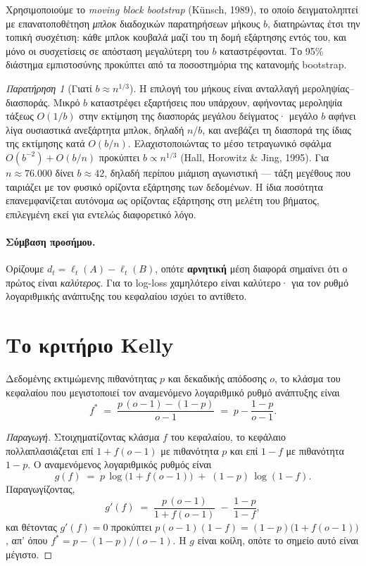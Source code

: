 \documentclass[12pt,a4paper,oneside]{report}
\renewcommand{\_}{\oldunderscore\allowbreak}
\theoremstyle{definition}
\theoremstyle{plain}
\theoremstyle{remark}
\newtheorem{remark}[theorem]{Παρατήρηση}
\begin{document}
Χρησιμοποιούμε το \emph{moving block bootstrap} (Künsch, 1989), το οποίο δειγματοληπτεί με
επανατοποθέτηση \emph{μπλοκ} διαδοχικών παρατηρήσεων μήκους $b$, διατηρώντας έτσι την τοπική
συσχέτιση: κάθε μπλοκ κουβαλά μαζί του τη δομή εξάρτησης εντός του, και μόνο οι συσχετίσεις
σε απόσταση μεγαλύτερη του $b$ καταστρέφονται. Το 95\% διάστημα εμπιστοσύνης προκύπτει από
τα ποσοστημόρια της κατανομής bootstrap.

\begin{remark}[Γιατί $b \approx n^{1/3}$]
Η επιλογή του μήκους είναι ανταλλαγή μεροληψίας--διασποράς. Μικρό $b$ καταστρέφει εξαρτήσεις
που υπάρχουν, αφήνοντας μεροληψία τάξεως $O(1/b)$ στην εκτίμηση της διασποράς μεγάλου
δείγματος· μεγάλο $b$ αφήνει λίγα ουσιαστικά ανεξάρτητα μπλοκ, δηλαδή $n/b$, και ανεβάζει τη
διασπορά της ίδιας της εκτίμησης κατά $O(b/n)$. Ελαχιστοποιώντας το μέσο τετραγωνικό σφάλμα
$O(b^{-2}) + O(b/n)$ προκύπτει $b \propto n^{1/3}$ (Hall, Horowitz \& Jing, 1995). Για
$n \approx 76.000$ δίνει $b \approx 42$, δηλαδή περίπου μιάμιση αγωνιστική --- τάξη μεγέθους
που ταιριάζει με τον φυσικό ορίζοντα εξάρτησης των δεδομένων. Η ίδια ποσότητα επανεμφανίζεται
αυτόνομα ως ορίζοντας εξάρτησης στη μελέτη του βήματος, επιλεγμένη εκεί για εντελώς
διαφορετικό λόγο.
\end{remark}

\paragraph{Σύμβαση προσήμου.} Ορίζουμε $d_t = \ell_t(A) - \ell_t(B)$, οπότε \textbf{αρνητική}
μέση διαφορά σημαίνει ότι ο πρώτος είναι \emph{καλύτερος}. Για το log-loss χαμηλότερο είναι
καλύτερο· για τον ρυθμό λογαριθμικής ανάπτυξης του κεφαλαίου ισχύει το αντίθετο.

\section{Το κριτήριο Kelly}
\label{sec:kelly-theory}

Δεδομένης εκτιμώμενης πιθανότητας $p$ και δεκαδικής απόδοσης $o$, το κλάσμα του κεφαλαίου που
μεγιστοποιεί τον αναμενόμενο λογαριθμικό ρυθμό ανάπτυξης είναι
\[
f^{*} \;=\; \frac{p\,(o-1) - (1-p)}{o-1} \;=\; p - \frac{1-p}{o-1}.
\]
\begin{proof}[Παραγωγή]
Στοιχηματίζοντας κλάσμα $f$ του κεφαλαίου, το κεφάλαιο πολλαπλασιάζεται επί $1+f(o-1)$ με
πιθανότητα $p$ και επί $1-f$ με πιθανότητα $1-p$. Ο αναμενόμενος λογαριθμικός ρυθμός είναι
\[
g(f) \;=\; p\,\log\big(1+f(o-1)\big) \;+\; (1-p)\,\log(1-f).
\]
Παραγωγίζοντας,
\[
g'(f) \;=\; \frac{p\,(o-1)}{1+f(o-1)} \;-\; \frac{1-p}{1-f},
\]
και θέτοντας $g'(f)=0$ προκύπτει $p(o-1)(1-f) = (1-p)\big(1+f(o-1)\big)$, απ' όπου
$f^{*} = p - (1-p)/(o-1)$. Η $g$ είναι κοίλη, οπότε το σημείο αυτό είναι μέγιστο.
\end{proof}
\end{document}
